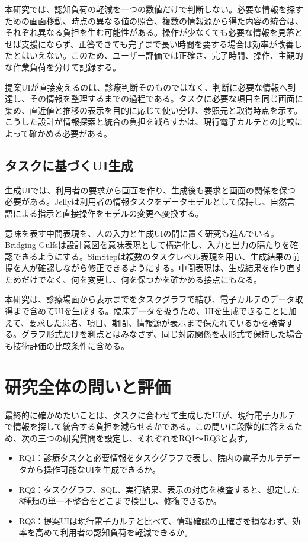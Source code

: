 \documentclass[a4paper]{jsarticle}
\begin{document}
本研究では、認知負荷の軽減を一つの数値だけで判断しない。必要な情報を探すための画面移動、時点の異なる値の照合、複数の情報源から得た内容の統合は、それぞれ異なる負担を生む可能性がある。操作が少なくても必要な情報を見落とせば支援にならず、正答できても完了まで長い時間を要する場合は効率が改善したとはいえない。このため、ユーザー評価では正確さ、完了時間、操作、主観的な作業負荷を分けて記録する。

提案UIが直接変えるのは、診療判断そのものではなく、判断に必要な情報へ到達し、その情報を整理するまでの過程である。タスクに必要な項目を同じ画面に集め、直近値と推移の表示を目的に応じて使い分け、参照元と取得時点を示す。こうした設計が情報探索と統合の負担を減らすかは、現行電子カルテとの比較によって確かめる必要がある。

\subsection{タスクに基づくUI生成}

生成UIでは、利用者の要求から画面を作り、生成後も要求と画面の関係を保つ必要がある。Jellyは利用者の情報タスクをデータモデルとして保持し、自然言語による指示と直接操作をモデルの変更へ変換する\cite{cao2025jelly}。

意味を表す中間表現を、人の入力と生成UIの間に置く研究も進んでいる。Bridging Gulfsは設計意図を意味表現として構造化し、入力と出力の隔たりを確認できるようにする\cite{park2026bridging}。SimStepは複数のタスクレベル表現を用い、生成結果の前提を人が確認しながら修正できるようにする\cite{kaputa2026simstep}。中間表現は、生成結果を作り直すためだけでなく、何を変更し、何を保つかを確かめる接点にもなる。

本研究は、診療場面から表示までをタスクグラフで結び、電子カルテのデータ取得まで含めてUIを生成する。臨床データを扱うため、UIを生成できることに加えて、要求した患者、項目、期間、情報源が表示まで保たれているかを検査する。グラフ形式だけを利点とはみなさず、同じ対応関係を表形式で保持した場合も技術評価の比較条件に含める。

\section{研究全体の問いと評価}

最終的に確かめたいことは、タスクに合わせて生成したUIが、現行電子カルテで情報を探して統合する負担を減らせるかである。この問いに段階的に答えるため、次の三つの研究質問を設定し、それぞれをRQ1～RQ3と表す。

\begin{itemize}
  \item RQ1：診療タスクと必要情報をタスクグラフで表し、院内の電子カルテデータから操作可能なUIを生成できるか。
  \item RQ2：タスクグラフ、SQL、実行結果、表示の対応を検査すると、想定した8種類の単一不整合をどこまで検出し、修復できるか。
  \item RQ3：提案UIは現行電子カルテと比べて、情報確認の正確さを損なわず、効率を高めて利用者の認知負荷を軽減できるか。
\end{itemize}
\end{document}
